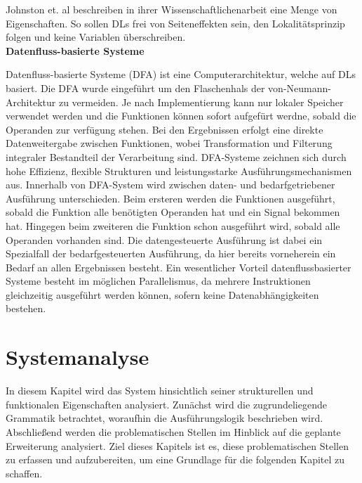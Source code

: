 \documentclass{article}
\begin{document}
    Johnston et. al beschreiben in ihrer Wissenschaftlichenarbeit eine Menge von Eigenschaften. So sollen DLs frei von Seiteneffekten sein, den Lokalitätsprinzip folgen und keine Variablen überschreiben.\cite{2} \\
    \textbf{Datenfluss-basierte Systeme} \par
    Datenfluss-basierte Systeme (DFA) ist eine Computerarchitektur, welche auf DLs basiert. 
    Die DFA wurde eingeführt um den Flaschenhals der von-Neumann-Architektur zu vermeiden. Je nach Implementierung kann nur lokaler Speicher verwendet werden und die Funktionen können sofort aufgefürt werdne, sobald die Operanden zur verfügung stehen. \cite{8}
    Bei den Ergebnissen erfolgt eine direkte Datenweitergabe zwischen Funktionen, wobei Transformation und Filterung integraler Bestandteil der Verarbeitung sind. \cite{15}
    DFA-Systeme zeichnen sich durch hohe Effizienz, flexible Strukturen und leistungsstarke Ausführungsmechanismen aus. \cite{1}
    Innerhalb von DFA-System wird zwischen daten- und bedarfgetriebener Ausführung unterschieden. Beim ersteren werden die Funktionen ausgeführt, sobald die Funktion alle benötigten Operanden hat und ein Signal bekommen hat. Hingegen beim zweiteren die Funktion schon ausgeführt wird, sobald alle Operanden vorhanden sind. \cite{2}
    Die datengesteuerte Ausführung ist dabei ein Spezialfall der bedarfgesteuerten Ausführung, da hier bereits vorneherein ein Bedarf an allen Ergebnissen besteht. \cite{11}
    Ein wesentlicher Vorteil datenflussbasierter Systeme besteht im möglichen Parallelismus, da mehrere Instruktionen gleichzeitig ausgeführt werden können, sofern keine Datenabhängigkeiten bestehen. \cite{1}
    \newpage
    \section{Systemanalyse}
    In diesem Kapitel wird das System hinsichtlich seiner strukturellen und funktionalen Eigenschaften analysiert. 
    Zunächst wird die zugrundeliegende Grammatik betrachtet, woraufhin die Ausführungslogik beschrieben wird. Abschließend werden die problematischen Stellen im Hinblick auf die geplante Erweiterung analysiert.
    Ziel dieses Kapitels ist es, diese problematischen Stellen zu erfassen und aufzubereiten, um eine Grundlage für die folgenden Kapitel zu schaffen.\\
\end{document}
